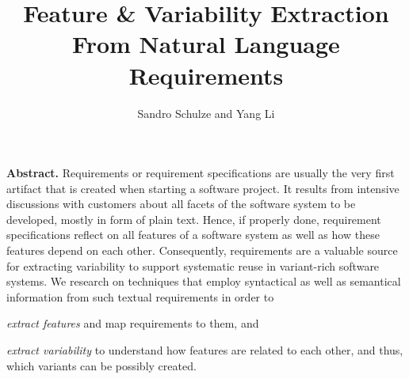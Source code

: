 \documentclass[graybox]{svmult}
\begin{document}
\title*{Feature \& Variability Extraction From Natural Language Requirements}
\author{Sandro Schulze and Yang Li}
%
%
\maketitle

\renewcommand{\abstract}[1]{\textbf{Abstract.} #1}
\abstract{Requirements or requirement specifications are usually the very first artifact that is created when starting a software project. 
It results from intensive discussions with customers about all facets of the software system to be developed, mostly in form of plain text. 
Hence, if properly done, requirement specifications reflect on all features of a software system as well as how these features depend on each other. 
Consequently, requirements are a valuable source for extracting variability to support systematic reuse in variant-rich software systems.
We research on techniques that employ syntactical as well as semantical information from such textual requirements in order to 
\begin{inparaenum}[(1)]
\item \textit{extract features} and map requirements to them, and
\item \textit{extract variability} to understand how features are related to each other, and thus, which variants can be possibly created.
\end{inparaenum}
}
\end{document}
